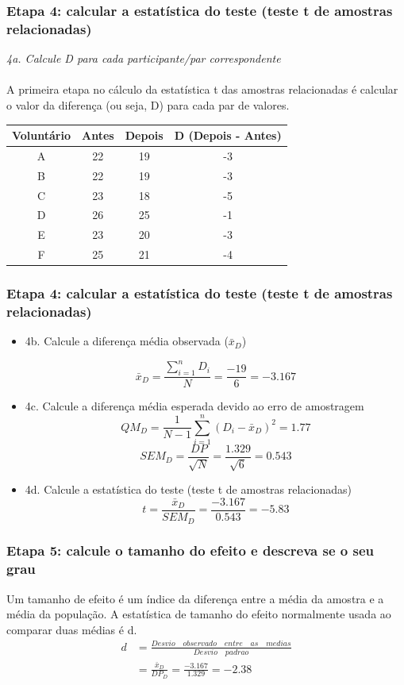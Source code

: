 \documentclass[11pt]{beamer}
\begin{document}
\begin{frame}
\frametitle{Etapa 4: calcular a estatística do teste (teste t de amostras relacionadas)}
\textit{4a. Calcule D para cada participante/par correspondente}\\~\\

A primeira etapa no cálculo da estatística t das amostras relacionadas é calcular o valor da diferença (ou seja, D) para cada par de valores. 

\begin{center}
\begin{tabular}{cccc} 
 \hline
Voluntário & Antes & Depois & D (Depois - Antes)\\
 \hline
A & 22 & 19 & -3\\
B & 22 & 19 & -3\\
C & 23 & 18 & -5\\
D & 26 & 25 & -1\\
E & 23 & 20 & -3\\
F & 25 & 21 & -4\\
 \hline
\end{tabular}
\end{center}   

\end{frame}

\begin{frame}
\frametitle{Etapa 4: calcular a estatística do teste (teste t de amostras relacionadas)}
\begin{itemize}
\item 4b. Calcule a diferença média observada ($\bar{x}_D$)

\[\bar{x}_D = \frac{\sum_{i=1}^n D_i}{N} = \frac{-19}{6} = -3.167\]

\item 4c. Calcule a diferença média esperada devido ao erro de amostragem
\[QM_D = \frac{1}{N-1}\sum_{i=1}^n(D_i - \bar{x}_D)^2 = 1.77\]
\[SEM_D = \frac{DP}{\sqrt{N}} = \frac{1.329}{\sqrt{6}} = 0.543\]
\item 4d. Calcule a estatística do teste (teste t de amostras relacionadas)
\[t =  \frac{\bar{x}_D}{SEM_D}  = \frac{-3.167}{0.543} = -5.83\]
\end{itemize}
\end{frame}

\begin{frame}
\frametitle{Etapa 5: calcule o tamanho do efeito e descreva se o seu grau}
Um tamanho de efeito é um índice da diferença entre a média da amostra e a média da população. A estatística de tamanho do efeito normalmente usada ao comparar duas médias é d. 
\begin{align*}
d &= \frac{Desvio\quad observado\quad entre\quad as\quad medias}{Desvio\quad padrao}\\
  &= \frac{\bar{x}_D}{DP_D} = \frac{-3.167}{1.329} =  -2.38
\end{align*}

\end{frame}
\end{document}
